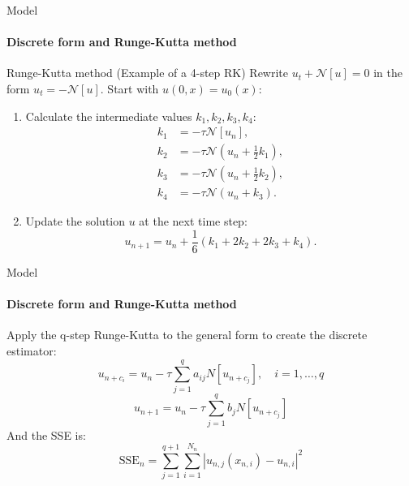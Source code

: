 \begin{frame}{Model}
\framesubtitle{Discrete form and Runge-Kutta method}
    \begin{block}{Runge-Kutta method}
    (Example of a 4-step RK)
    Rewrite \( u_t + \mathcal{N}[u] = 0 \) in the form \( u_t = -\mathcal{N}[u] \).
    Start with \( u(0, x) = u_0(x) \):
    \begin{enumerate}
        \item Calculate the intermediate values \( k_1, k_2, k_3, k_4 \):
        \begin{align*}
            k_1 &= -\tau \mathcal{N}[u_n], \\
            k_2 &= -\tau \mathcal{N} \left( u_n + \frac{1}{2} k_1 \right), \\
            k_3 &= -\tau \mathcal{N} \left( u_n + \frac{1}{2} k_2 \right), \\
            k_4 &= -\tau \mathcal{N} \left( u_n + k_3 \right).
        \end{align*}

        \item Update the solution \( u \) at the next time step:
        \[
        u_{n+1} = u_n + \frac{1}{6} (k_1 + 2k_2 + 2k_3 + k_4).
        \]
    \end{enumerate}
    \end{block}
\end{frame}

\begin{frame}{Model}
\framesubtitle{Discrete form and Runge-Kutta method}
    Apply the q-step Runge-Kutta to the general form to create the discrete estimator:
    \begin{equation}
    u_{n+c_i} = u_n - \tau \sum_{j=1}^q a_{ij} N[u_{n+c_j}], \quad i = 1, \ldots, q
    \end{equation}
    \begin{equation}
    u_{n+1} = u_n - \tau \sum_{j=1}^q b_j N[u_{n+c_j}]
    \end{equation}
    And the SSE is:
    \begin{equation}
    \text{SSE}_n = \sum_{j=1}^{q+1} \sum_{i=1}^{N_n} \left| u_{n,j}(x_{n,i}) - u_{n,i} \right|^2
    \end{equation}
\end{frame}    


